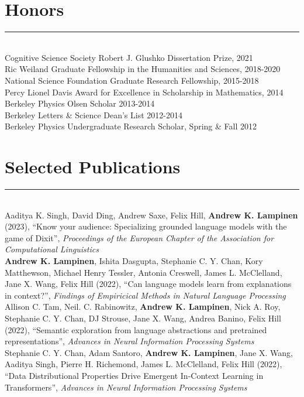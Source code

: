 \documentclass[margin]{res}
\begin{document}
\begin{resume}
\section{Honors} \vspace{-15pt} \rule{\textwidth}{0.5pt} \\[3pt]
Cognitive Science Society Robert J. Glushko Dissertation Prize, 2021 \\
Ric Weiland Graduate Fellowship in the Humanities and Sciences, 2018-2020 \\
National Science Foundation Graduate Research Fellowship, 2015-2018 \\
Percy Lionel Davis Award for Excellence in Scholarship in Mathematics, 2014 \\ 
Berkeley Physics Olsen Scholar 2013-2014 \\
Berkeley Letters \& Science Dean's List 2012-2014\\
Berkeley Physics Undergraduate Research Scholar, Spring \& Fall 2012
\vspace{1pt}\section{Selected Publications} \vspace{-15pt} \rule{\textwidth}{0.5pt} \\[3pt]
Aaditya K. Singh, David Ding, Andrew Saxe, Felix Hill, \textbf{Andrew K. Lampinen} (2023), {``Know your audience: Specializing grounded language models with the game of Dixit'',} \textit{Proceedings of the European Chapter of the Association for Computational Linguistics} \\[3pt] 
\textbf{Andrew K. Lampinen}, Ishita Dasgupta, Stephanie C. Y. Chan, Kory Matthewson, Michael Henry Tessler, Antonia Creswell, James L. McClelland, Jane X. Wang, Felix Hill (2022), {``Can language models learn from explanations in context?'',} \textit{Findings of Empiricical Methods in Natural Language Processing} \\[3pt] 
Allison C. Tam,  Neil. C. Rabinowitz, \textbf{Andrew K. Lampinen}, Nick A. Roy, Stephanie C. Y. Chan, DJ Strouse, Jane X. Wang, Andrea Banino, Felix Hill (2022), {``Semantic exploration from language abstractions and pretrained representations'',} \textit{Advances in Neural Information Processing Systems} \\[3pt] 
Stephanie C. Y. Chan, Adam Santoro, \textbf{Andrew K. Lampinen}, Jane X. Wang, Aaditya Singh, Pierre H. Richemond, James L. McClelland, Felix Hill (2022), {``Data Distributional Properties Drive Emergent In-Context Learning in Transformers'',} \textit{Advances in Neural Information Processing Systems} \\[3pt] 

\end{resume}
\end{document}
